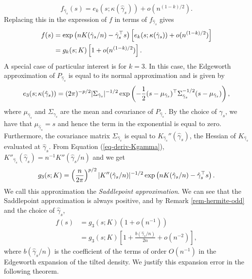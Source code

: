 \begin{equation*}
    f_{\hat\gamma_s}(s) = e_k(s; \kappa(\hat\gamma_s)) + o(n^{(1-k)/2}).
\end{equation*}
Replacing this in the expression of $f$ in terms of $f_{\hat\gamma_s}$ gives
\begin{align}
    f(s) &= \exp\left(nK(\hat\gamma_s / n) - \hat\gamma_s^\top s\right)\left[e_k(s; \kappa(\hat\gamma_s)) + o(n^{(1-k)/2})\right]\nonumber\\
    &= g_k(s; K)\left[1 + o(n^{(1-k)/2})\right]. \label{eq-saddle-exp}
\end{align}
A special case of particular interest is for $k = 3$. In this case, the Edgeworth approximation of $P_{\hat\gamma_s}$ is equal to its normal approximation and is given by
\begin{equation*}
    e_3(s; \kappa(\hat\gamma_s)) = (2\pi)^{-p/2}|\Sigma_{\hat\gamma_s}|^{-1/2}\exp\left(-\frac{1}{2}(s - \mu_{\hat\gamma_s})^\top \Sigma_{\hat\gamma_s}^{-1/2}(s - \mu_{\hat\gamma_s}) \right),
\end{equation*}
where $\mu_{\hat\gamma_s}$ and $\Sigma_{\hat\gamma_s}$ are the mean and covariance of $P_{\hat\gamma_s}$. By the choice of $\hat\gamma_s$, we have that $\mu_{\hat\gamma_s} = s$ and hence the term in the exponential is equal to zero. Furthermore, the covariance matrix $\Sigma_{\hat\gamma_s}$ is equal to $K_{\hat\gamma_s}''(\hat\gamma_s)$, the Hessian of $K_{\hat\gamma_s}$ evaluated at $\hat\gamma_s$. From Equation (\ref{eq-deriv-Kgamma}), $K''_{\hat\gamma_s}(\hat\gamma_s) = n^{-1} K''(\hat\gamma_s/n)$ and we get 
\begin{equation} \label{eq-saddle-3}
    g_3(s; K) = \left(\frac{n}{2\pi}\right)^{p/2}|K''(\hat\gamma_s/n)|^{-1/2} \exp\left(nK(\hat\gamma_s / n) - \hat\gamma_s^\top s\right).
\end{equation}
We call this approximation the \textit{Saddlepoint approximation}. We can see that the Saddlepoint approximation is always positive, and by Remark \ref{rem-hermite-odd} and the choice of $\hat\gamma_s$,
\begin{align}
    f(s) 
    &= g_3(s; K)(1 + o(n^{-1}))\nonumber\\
    &= g_3(s; K)\left[1 + \frac{b(\hat\gamma_s / n)}{2n} + o(n^{-2})\right], \label{eq-saddle-o2}
\end{align}
where $b(\hat\gamma_s / n)$ is the coefficient of the terms of order $O(n^{-1})$ in the Edgeworth expansion of the tilted density. We justify this expansion error in the following theorem.

